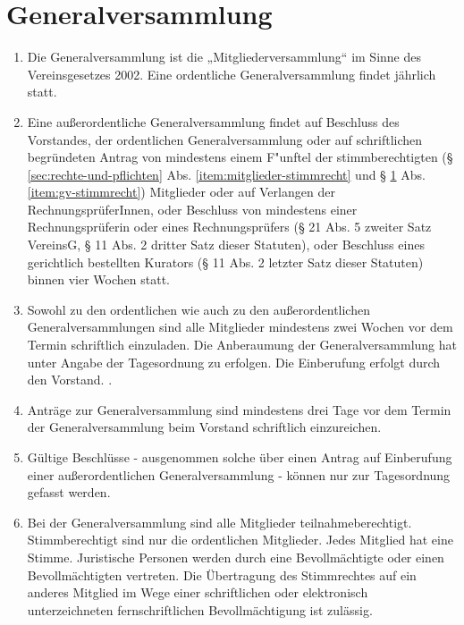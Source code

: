 \documentclass[a4paper,12pt]{article}
\newcommand{\comment}[1]{{\bf /*Komm.:} \textit{#1} {\bf */}}
\def\comment#1{}
\begin{document}
\section{Generalversammlung} %
\label{sec:generalversammlung}
\begin{enumerate}
\item Die Generalversammlung ist die „Mitgliederversammlung“ im Sinne des Vereinsgesetzes 2002. Eine ordentliche Generalversammlung findet jährlich statt.
\item Eine außerordentliche Generalversammlung findet auf Beschluss des Vorstandes, der ordentlichen Generalversammlung oder
auf schriftlichen begründeten Antrag von mindestens einem F"unftel der stimmberechtigten (§ \ref{sec:rechte-und-pflichten} Abs. \ref{item:mitglieder-stimmrecht} und § \ref{sec:generalversammlung} Abs. \ref{item:gv-stimmrecht}) Mitglieder
oder auf Verlangen der RechnungsprüferInnen, oder
Beschluss von mindestens einer Rechnungspr\"uferin oder eines Rechnungspr\"ufers (§ 21 Abs. 5 zweiter Satz VereinsG, § 11 Abs. 2 dritter Satz dieser Statuten), oder Beschluss eines gerichtlich bestellten Kurators (§ 11 Abs. 2 letzter Satz dieser Statuten)
binnen vier Wochen statt. \comment{die 2 zusätzlichen Möglichkeiten wie BMI orig. dabei}
\item Sowohl zu den ordentlichen wie auch zu den außerordentlichen Generalversammlungen sind alle Mitglieder mindestens zwei Wochen vor dem Termin schriftlich einzuladen. Die Anberaumung der Generalversammlung hat unter Angabe der Tagesordnung zu erfolgen. Die Einberufung erfolgt durch den Vorstand.
\comment{... oder durch die/einen Rechnungsprüfer (Abs. 2 lit. d) oder durch einen gerichtlich bestellten Kurator (Abs. 2 lit. e) ...}.

\item Anträge zur Generalversammlung sind mindestens drei Tage vor dem Termin der Generalversammlung beim Vorstand schriftlich einzureichen.

\item Gültige Beschlüsse - ausgenommen solche über einen Antrag auf Einberufung einer außerordentlichen Generalversammlung - können nur zur Tagesordnung gefasst werden.

\item \label{item:gv-stimmrecht} Bei der Generalversammlung sind alle Mitglieder teilnahmeberechtigt.
Stimmberechtigt sind nur die ordentlichen Mitglieder.
Jedes Mitglied hat eine Stimme.
Juristische Personen werden durch eine Bevollm\"achtigte oder einen Bevollm\"achtigten vertreten.
Die Übertragung des Stimmrechtes auf ein anderes Mitglied im Wege einer schriftlichen oder elektronisch unterzeichneten fernschriftlichen Bevollmächtigung ist zulässig.


\end{enumerate}
\end{document}
